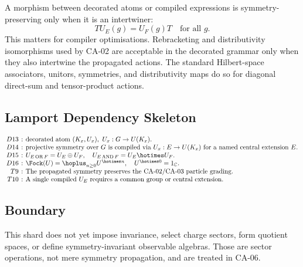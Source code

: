 A morphism between decorated atoms or compiled expressions is symmetry-preserving
only when it is an intertwiner:
\[
  T U_E(g)=U_F(g)T\quad\text{for all }g.
\]
This matters for compiler optimisations.  Rebracketing and distributivity
isomorphisms used by CA-02 are acceptable in the decorated grammar only when they
also intertwine the propagated actions.  The standard Hilbert-space associators,
unitors, symmetries, and distributivity maps do so for diagonal direct-sum and
tensor-product actions.

\subsection{Lamport Dependency Skeleton}

{\small
\[
\setlength{\arraycolsep}{2pt}
\begin{array}{rcl}
D13 &:& \text{decorated atom }(K_x,U_x),\ U_x:G\to U(K_x).\\
D14 &:& \text{projective symmetry over }G\text{ is compiled via }U_x:E\to U(K_x)
        \text{ for a named central extension }E.\\
D15 &:& U_{E\operatorname{OR}F}=U_E\oplus U_F,\quad
        U_{E\operatorname{AND}F}=U_E\hotimes U_F.\\
D16 &:& \Fock(U)=\hoplus_{n\ge0}U^{\hotimes n},\quad U^{\hotimes0}=1_{\mathbb C}.\\
T9 &:& \text{The propagated symmetry preserves the CA-02/CA-03 particle grading.}\\
T10 &:& \text{A single compiled }U_E\text{ requires a common group or central extension.}
\end{array}
\]
}

\subsection{Boundary}

This shard does not yet impose invariance, select charge sectors, form quotient
spaces, or define symmetry-invariant observable algebras.  Those are sector
operations, not mere symmetry propagation, and are treated in CA-06.
